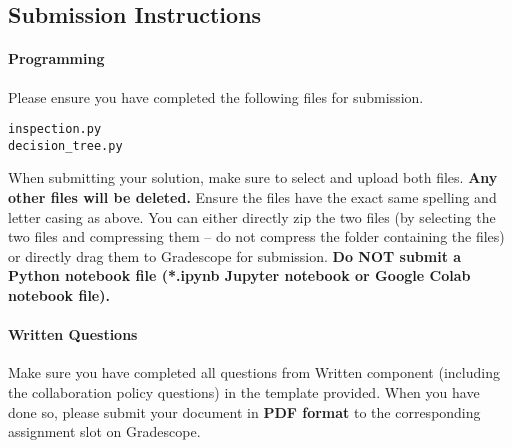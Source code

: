 \documentclass[11pt,addpoints,answers]{exam}
\begin{document}
\subsection{Submission Instructions}

\paragraph{Programming}
Please ensure you have completed the following files for submission.


\begin{verbatim}
inspection.py
decision_tree.py
\end{verbatim}

When submitting your solution, make sure to select and upload both files. \textbf{Any other files will be deleted.} Ensure the files have the exact same spelling and letter casing as above. You can either directly zip the two files (by selecting the two files and compressing them -- do not compress the folder containing the files) or directly drag them to Gradescope for submission. \textbf{Do NOT submit a Python notebook file (*.ipynb Jupyter notebook or Google Colab notebook file).}


\paragraph{Written Questions}
Make sure you have completed all questions from Written component (including the collaboration policy questions) in the template provided.  When you have done so, please submit your document in \textbf{PDF format} to the corresponding assignment slot on Gradescope.



\newpage
\end{document}
